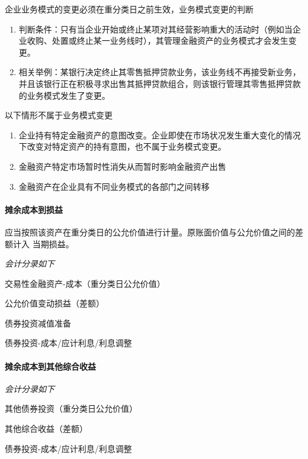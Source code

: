 \documentclass[UTF8,12pt]{ctexart}
\newenvironment{Dr}{%
	\begin{list}{}%
		{
			\setlength{\leftmargin}{2em}
			\setlength{\labelwidth}{2em}
			\setlength{\labelsep}{0pt}
			\setlength{\itemindent}{0pt}
			\setlength{\listparindent}{0pt}
			\setlength{\parsep}{0pt}
			\setlength{\topsep}{0pt}
		}
		\item[\textbf{借：}]
	}{%
	\end{list}
}
\newenvironment{Cr}{%
	\begin{list}{}%
		{
			\setlength{\leftmargin}{3em}
			\setlength{\labelwidth}{2em}
			\setlength{\labelsep}{0pt}
			\setlength{\itemindent}{0pt}
			\setlength{\listparindent}{0pt}
			\setlength{\parsep}{0pt}
			\setlength{\topsep}{0pt}
		}
		\item[\textbf{贷：}]
	}{%
	\end{list}
}
\numberwithin{equation}{section} %
\numberwithin{figure}{section}
\numberwithin{table}{section}
\begin{document}
			
	企业业务模式的变更必须在重分类日之前生效，业务模式变更的判断
	\begin{enumerate}
		\item 判断条件：只有当企业开始或终止某项对其经营影响重大的活动时（例如当企业收购、处置或终止某一业务线时），其管理金融资产的业务模式才会发生变更。
		
		\item 相关举例：某银行决定终止其零售抵押贷款业务，该业务线不再接受新业务，并且该银行正在积极寻求出售其抵押贷款组合，则该银行管理其零售抵押贷款的业务模式发生了变更。
	\end{enumerate}

	以下情形不属于业务模式变更
	\begin{enumerate}
		\item 企业持有特定金融资产的意图改变。企业即使在市场状况发生重大变化的情况下改变对特定资产的持有意图，也不属于业务模式变更。
		
		\item 金融资产特定市场暂时性消失从而暂时影响金融资产出售
		
		\item 金融资产在企业具有不同业务模式的各部门之间转移
	\end{enumerate}

	
	\paragraph{摊余成本到损益}
	应当按照该资产在重分类日的公允价值进行计量。原账面价值与公允价值之间的差额计入
	当期损益。
	
	\textit{会计分录如下}
	
	\begin{Dr}
		交易性金融资产-成本（重分类日公允价值）
		
		公允价值变动损益（差额）
		
		债券投资减值准备
	\end{Dr}
	\begin{Cr}
		债券投资-成本/应计利息/利息调整
	\end{Cr}
	
	\paragraph{摊余成本到其他综合收益}\textit{会计分录如下}
	
	\begin{Dr}
		其他债券投资（重分类日公允价值）
		
		其他综合收益（差额）
	\end{Dr}
	\begin{Cr}
		债券投资-成本/应计利息/利息调整
	\end{Cr}
	
\end{document}
